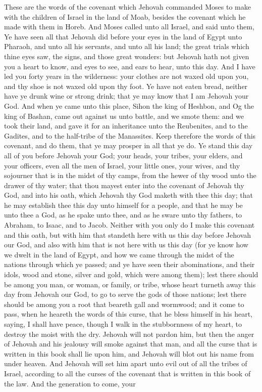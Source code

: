 These are the words of the covenant which Jehovah commanded Moses to make with the children of Israel in the land of Moab, besides the covenant which he made with them in Horeb.  And Moses called unto all Israel, and said unto them, Ye have seen all that Jehovah did before your eyes in the land of Egypt unto Pharaoh, and unto all his servants, and unto all his land; the great trials which thine eyes saw, the signs, and those great wonders: but Jehovah hath not given you a heart to know, and eyes to see, and ears to hear, unto this day. And I have led you forty years in the wilderness: your clothes are not waxed old upon you, and thy shoe is not waxed old upon thy foot. Ye have not eaten bread, neither have ye drunk wine or strong drink; that ye may know that I am Jehovah your God. And when ye came unto this place, Sihon the king of Heshbon, and Og the king of Bashan, came out against us unto battle, and we smote them: and we took their land, and gave it for an inheritance unto the Reubenites, and to the Gadites, and to the half-tribe of the Manassites. Keep therefore the words of this covenant, and do them, that ye may prosper in all that ye do.  Ye stand this day all of you before Jehovah your God; your heads, your tribes, your elders, and your officers, even all the men of Israel, your little ones, your wives, and thy sojourner that is in the midst of thy camps, from the hewer of thy wood unto the drawer of thy water; that thou mayest enter into the covenant of Jehovah thy God, and into his oath, which Jehovah thy God maketh with thee this day; that he may establish thee this day unto himself for a people, and that he may be unto thee a God, as he spake unto thee, and as he sware unto thy fathers, to Abraham, to Isaac, and to Jacob.  Neither with you only do I make this covenant and this oath, but with him that standeth here with us this day before Jehovah our God, and also with him that is not here with us this day (for ye know how we dwelt in the land of Egypt, and how we came through the midst of the nations through which ye passed; and ye have seen their abominations, and their idols, wood and stone, silver and gold, which were among them); lest there should be among you man, or woman, or family, or tribe, whose heart turneth away this day from Jehovah our God, to go to serve the gods of those nations; lest there should be among you a root that beareth gall and wormwood; and it come to pass, when he heareth the words of this curse, that he bless himself in his heart, saying, I shall have peace, though I walk in the stubbornness of my heart, to destroy the moist with the dry. Jehovah will not pardon him, but then the anger of Jehovah and his jealousy will smoke against that man, and all the curse that is written in this book shall lie upon him, and Jehovah will blot out his name from under heaven. And Jehovah will set him apart unto evil out of all the tribes of Israel, according to all the curses of the covenant that is written in this book of the law.  And the generation to come, your 